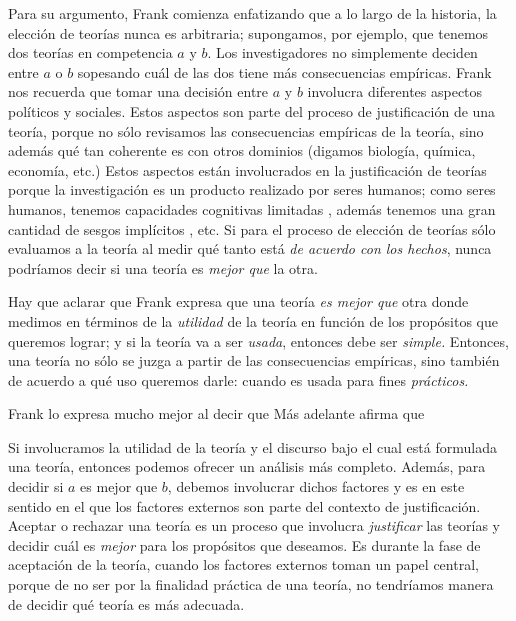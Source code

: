 Para su argumento, Frank comienza enfatizando que a lo largo de la historia, la elección de teorías nunca es arbitraria;
supongamos, por ejemplo, que tenemos dos teorías en competencia $a$ y $b$.
Los investigadores no simplemente deciden entre $a$ o $b$ sopesando cuál de las dos tiene más consecuencias empíricas.
Frank nos recuerda que tomar una decisión entre $a$ y $b$ involucra diferentes aspectos políticos y sociales.
Estos aspectos son parte del proceso de justificación de una teoría, porque no sólo revisamos las consecuencias empíricas de la teoría, sino además qué tan coherente es con otros dominios (digamos biología, química, economía, etc.)
Estos aspectos están involucrados en la justificación de teorías  porque la investigación es un producto realizado por seres humanos;
como seres humanos, tenemos capacidades cognitivas limitadas \parencite{Potochnik2017-POTIAT-3}, además tenemos una gran cantidad de sesgos implícitos \parencite{nordell2021end}, etc.
Si para el proceso de elección de teorías sólo evaluamos a la teoría al medir qué tanto está \emph{de acuerdo con los hechos}, nunca podríamos decir si una teoría es \emph{mejor que} la otra.

Hay que aclarar que Frank expresa que una teoría \emph{es mejor que} otra donde medimos  en términos de la \emph{utilidad} de la teoría en función de los propósitos que queremos lograr;
y si la teoría va a ser \emph{usada}, entonces debe ser \emph{simple.}
Entonces, una teoría no sólo se juzga a partir de las consecuencias empíricas, sino también de acuerdo a qué uso queremos darle: cuando es usada para fines \emph{prácticos.}

Frank lo expresa mucho mejor al decir que  \parencite[p.~4]{Frank1956}
Más adelante afirma que  

Si involucramos la utilidad de la teoría y el discurso bajo el cual está formulada una teoría, entonces podemos ofrecer un análisis más completo.
Además, para decidir si $a$ es mejor que $b$, debemos involucrar dichos factores y es en este sentido en el que los factores externos son parte del contexto de justificación.
Aceptar o rechazar una teoría es un proceso que involucra \emph{justificar} las teorías y decidir cuál es \emph{mejor} para los propósitos que deseamos.
Es durante la fase de aceptación de la teoría, cuando los factores externos toman un papel central, porque de no ser por la finalidad práctica de una teoría, no tendríamos manera de decidir qué teoría es más adecuada.

